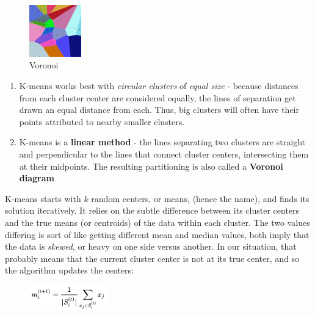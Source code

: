 \documentclass{article}
\begin{document}
\begin{figure}
  \begin{center}
    \vspace{-77pt}
    \includegraphics[width=0.2\textwidth]{voronoi.png}
    \vspace{-32pt}
  \end{center}
  \caption{Voronoi}
  \vspace{-27pt}
\end{figure}
\begin{minipage}{.75\textwidth}
    \vspace{2pt}
    \begin{enumerate}
        \item K-means works best with \textit{circular clusters} of \textit{equal size} - because distances from each cluster center are considered equally, the lines of separation get drawn an equal distance from each. Thus, big clusters will often have their points attributed to nearby smaller clusters.
        \item K-means is a \textbf{linear method} - the lines separating two clusters are straight and perpendicular to the lines that connect cluster centers, intersecting them at their midpoints. The resulting partitioning is also called a \textbf{Voronoi diagram}
    \end{enumerate}
\end{minipage}

K-means starts with $k$ random centers, or means, (hence the name), and finds its solution iteratively. It relies on the subtle difference between its cluster centers and the true means (or centroids) of the data within each cluster. The two values differing is sort of like getting different mean and median values, both imply that the data is \textit{skewed}, or heavy on one side versus another. In our situation, that probably means that the current cluster center is not at its true center, and so the algorithm updates the centers:
\begin{figure}[!htb]
    \vspace{-6pt}
    \begin{center}
        \includegraphics[width=0.3\textwidth]{update.png}
    \end{center}
    \vspace{-20pt}
\end{figure}
\end{document}
